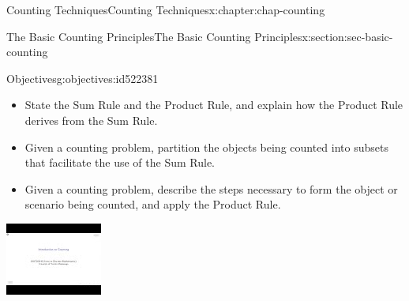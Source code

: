 \documentclass[oneside,10pt,]{book}
\numberwithin{equation}{section}
\newlength{\qrsize}
\newlength{\previewwidth}
\begin{document}
\begin{chapterptx}{Counting Techniques}{}{Counting Techniques}{}{}{x:chapter:chap-counting}
%
%
\typeout{************************************************}
\typeout{************************************************}
%
\begin{sectionptx}{The Basic Counting Principles}{}{The Basic Counting Principles}{}{}{x:section:sec-basic-counting}
\begin{objectives}{Objectives}{g:objectives:id522381}
%
\begin{itemize}[label=\textbullet]
\item{}State the Sum Rule and the Product Rule, and explain how the Product Rule derives from the Sum Rule.%
\item{}Given a counting problem, partition the objects being counted into subsets that facilitate the use of the Sum Rule.%
\item{}Given a counting problem, describe the steps necessary to form the object or scenario being counted, and apply the Product Rule.%
\end{itemize}
\end{objectives}
\begin{sidebyside}{1}{0}{0}{0}%
\begin{sbspanel}{1}%
\setlength{\qrsize}{9em}
\setlength{\previewwidth}{\linewidth}
\addtolength{\previewwidth}{-\qrsize}
\begin{tcbraster}[raster columns=2, raster column skip=1pt, raster halign=center, raster force size=false, raster left skip=0pt, raster right skip=0pt]%
\begin{tcolorbox}[previewstyle, width=\previewwidth]%
\includegraphics[width=0.80\linewidth,height=\qrsize,keepaspectratio]{images/video-intro-to-counting.jpg}%

\end{tcolorbox}
\end{tcbraster}
\end{sbspanel}
\end{sidebyside}
\end{sectionptx}
\end{chapterptx}
\end{document}
